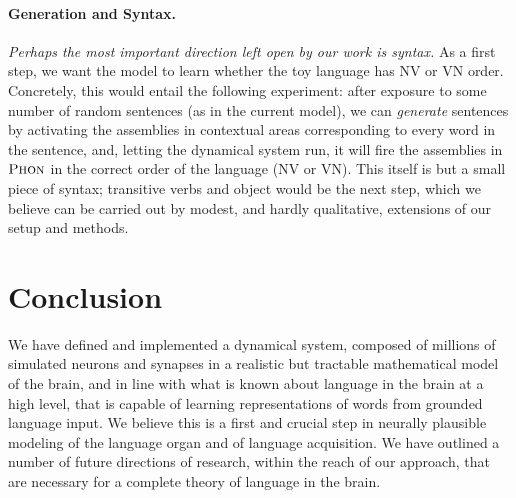 \documentclass{article}
\newcommand{\Phon}{\textsc{Phon}}
\begin{document}
\paragraph{Generation and Syntax.}
\emph{Perhaps the most important direction left open by our work is syntax.} As a first step, we want the model to learn whether the toy language has NV or VN order. Concretely, this would entail the following experiment: after exposure to some number of random sentences (as in the current model), we can \emph{generate} sentences by activating the assemblies in contextual areas corresponding to every word in the sentence, and, letting the dynamical system run, it will fire the assemblies in $\Phon$ in the correct order of the language (NV or VN). This itself is but a small piece of syntax; transitive verbs and object would be the next step, which we believe can be carried out by modest, and hardly qualitative, extensions of our setup and methods. 

\section{Conclusion}
We have defined and implemented a dynamical system, composed of millions of simulated neurons and synapses in a realistic but tractable mathematical model of the brain, and in line with what is known about language in the brain at a high level, that is capable of learning representations of words from grounded language input. We believe this is a first and crucial step in neurally plausible modeling of the language organ and of language acquisition. We have outlined a number of future directions of research, within the reach of our approach, that are necessary for a complete theory of language in the brain. 




\end{document}

